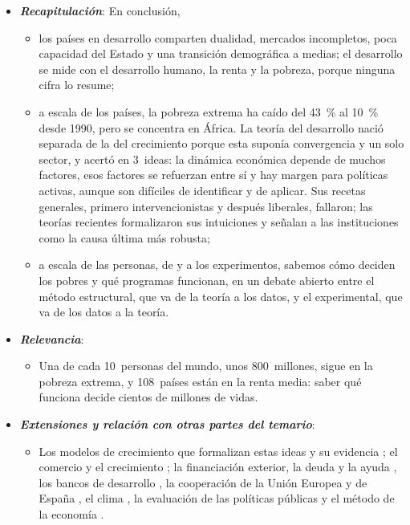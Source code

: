 \documentclass[11pt]{article}
\begin{document}
\begin{itemize}
\item \textbf{\emph{Recapitulación}}: En conclusión,
  \begin{itemize}
  \item los países en desarrollo comparten dualidad, mercados incompletos, poca capacidad del Estado y una transición demográfica a medias; el desarrollo se mide con el desarrollo humano, la renta y la pobreza, porque ninguna cifra lo resume;
  \item a escala de los países, la pobreza extrema ha caído del 43~\% al 10~\% desde 1990, pero se concentra en África. La teoría del desarrollo nació separada de la del crecimiento porque esta suponía convergencia y un solo sector, y acertó en 3~ideas: la dinámica económica depende de muchos factores, esos factores se refuerzan entre sí y hay margen para políticas activas, aunque son difíciles de identificar y de aplicar. Sus recetas generales, primero intervencionistas y después liberales, fallaron; las teorías recientes formalizaron sus intuiciones y señalan a las instituciones como la causa última más robusta;
  \item a escala de las personas, de  y  a los experimentos, sabemos cómo deciden los pobres y qué programas funcionan, en un debate abierto entre el método estructural, que va de la teoría a los datos, y el experimental, que va de los datos a la teoría.
  \end{itemize}
\item \textbf{\emph{Relevancia}}:
  \begin{itemize}
  \item Una de cada 10~personas del mundo, unos 800~millones, sigue en la pobreza extrema, y 108~países están en la renta media\nocite{BM2026PIP,BM2024Informe}: saber qué funciona decide cientos de millones de vidas.
  \end{itemize}
\item \textbf{\emph{Extensiones y relación con otras partes del temario}}:
  \begin{itemize}
  \item Los modelos de crecimiento que formalizan estas ideas   y su evidencia ; el comercio y el crecimiento ; la financiación exterior, la deuda y la ayuda , los bancos de desarrollo , la cooperación de la Unión Europea y de España  , el clima , la evaluación de las políticas públicas  y el método de la economía .

\end{itemize}
\end{itemize}
\end{document}
